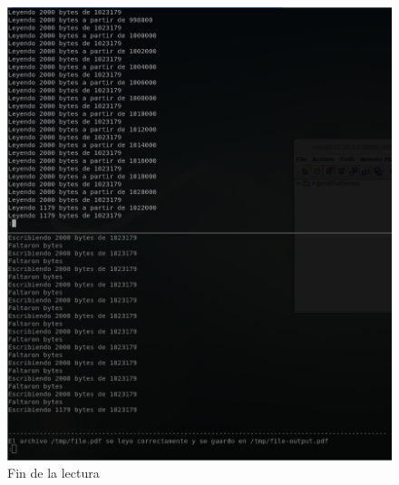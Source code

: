 \documentclass[12pt,journal,compsoc]{IEEEtran}
\begin{document}
\begin{figure}[H]
  \centering
  \includegraphics[width=160mm]{images/punto-3/readwrite/3-end-read.png}
  \caption{Fin de la lectura}
  \label{fig:end-read2}
\end{figure}
\end{document}
